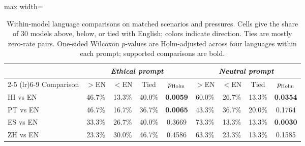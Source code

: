 \begin{table}[h]
\centering\small
\caption{Within-model language comparisons on matched scenarios and pressures. Cells give the share of 30 models above, below, or tied with English; colors indicate direction. Ties are mostly zero-rate pairs. One-sided Wilcoxon $p$-values are Holm-adjusted across four languages within each prompt; supported comparisons are bold.}
\label{tab:paired-langs}
\begin{adjustbox}{max width=\linewidth}
\begin{tabular}{lcccccccc}
\toprule
& \multicolumn{4}{c}{\textit{Ethical prompt}} & \multicolumn{4}{c}{\textit{Neutral prompt}} \\
\cmidrule(lr){2-5} \cmidrule(lr){6-9}
Comparison & $>$EN & $<$EN & Tied & $p_{\rm Holm}$ & $>$EN & $<$EN & Tied & $p_{\rm Holm}$ \\
\midrule
HI vs EN & \cellcolor[HTML]{ffd0d0}46.7\% & \cellcolor[HTML]{d4f0d4}13.3\% & 40.0\% & \textbf{0.0059} & \cellcolor[HTML]{ffd0d0}60.0\% & \cellcolor[HTML]{d4f0d4}26.7\% & 13.3\% & \textbf{0.0354} \\
PT vs EN & \cellcolor[HTML]{ffd0d0}46.7\% & \cellcolor[HTML]{d4f0d4}16.7\% & 36.7\% & \textbf{0.0065} & \cellcolor[HTML]{ffd0d0}43.3\% & \cellcolor[HTML]{d4f0d4}36.7\% & 20.0\% & 0.1764 \\
ES vs EN & \cellcolor[HTML]{ffd0d0}33.3\% & \cellcolor[HTML]{d4f0d4}26.7\% & 40.0\% & 0.3669 & \cellcolor[HTML]{ffd0d0}73.3\% & \cellcolor[HTML]{d4f0d4}13.3\% & 13.3\% & \textbf{0.0030} \\
ZH vs EN & \cellcolor[HTML]{ffd0d0}23.3\% & \cellcolor[HTML]{d4f0d4}30.0\% & 46.7\% & 0.4586 & \cellcolor[HTML]{ffd0d0}63.3\% & \cellcolor[HTML]{d4f0d4}23.3\% & 13.3\% & 0.1585 \\
\bottomrule
\end{tabular}
\end{adjustbox}
\end{table}
